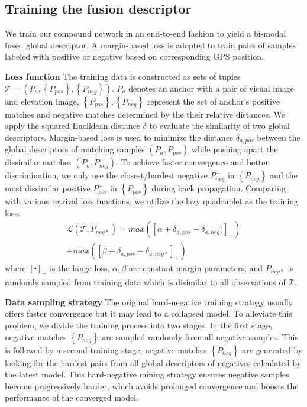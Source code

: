 \documentclass[letterpaper, 10 pt, conference]{ieeeconf}  \usepackage{tabularx}
\begin{document}
\subsection{Training the fusion descriptor}

We train our compound network in an end-to-end fashion to yield a bi-modal fused global descriptor. A margin-based loss is adopted to train pairs of samples labeled with positive or negative based on corresponding GPS position.

\textbf{Loss function} The training data is constructed as sets of tuples $ \mathcal{T} = (P_a, \left\{P_{pos}\right\}, \left\{ P_{neg}\right\})$. $P_a$ denotes an anchor with a pair of visual image and elevation image, $\left\{P_{pos}\right\}, \left\{ P_{neg}\right\}$ represent the set of anchor's positive matches and negative matches determined by the their relative distances. We apply the squared Euclidean distance $\delta$ to evaluate the similarity of two global descriptors. Margin-based loss is used to minimize the distance $\delta_{a,pos}$ between the global descriptors of matching samples $(P_a, P_{pos})$ while pushing apart the dissimilar matches $(P_a, P_{neg})$. To achieve faster convergence and better discrimination, we only use the closest/hardest negative $P^{-}_{neg}$ in $\left\{P_{neg}\right\}$ and the most dissimilar positive $P^{+}_{pos}$ in $\left\{P_{pos}\right\}$ during back propagation. Comparing with various retrival loss functions, we utilize the lazy quadruplet \cite{chen2017beyond} as the training loss:
\begin{equation}\label{eq3}
\begin{split}
\mathcal{L}(\mathcal{T}, P_{neg*}) = max([\alpha + \delta_{a,pos} - \delta_{a,neg})]_{+})\\
+max([\beta + \delta_{a,pos} - \delta_{a,neg*}]_{+})
\end{split}
\end{equation}
where $[\centerdot]_+$ is the hinge loss, $\alpha, \beta$ are constant margin parameters, and $P_{neg*}$ is randomly sampled from training data which is disimilar to all observations of $\mathcal{T}$.

\textbf{Data sampling strategy} The original hard-negative training strategy usually offers faster convergence but it may lead to a collapsed model. To alleviate this problem, we divide the training process into two stages. In the first stage, negative matches $\left\{ P_{neg}\right\}$ are sampled randomly from all negative samples. This is followed by a second training stage, negative matches $\left\{ P_{neg}\right\}$ are generated by looking for the hardest pairs from all global descriptors of negatives calculated by the latest model. This hard-negative mining strategy ensures negative samples become progressively harder, which avoids prolonged convergence and boosts the performance of the converged model.
\end{document}
